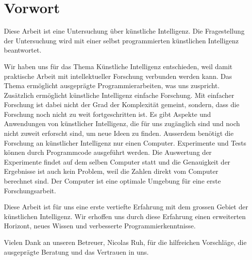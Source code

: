 \section*{Vorwort}
Diese Arbeit ist eine Untersuchung über künstliche Intelligenz. Die
Fragestellung der Untersuchung wird mit einer selbst programmierten künstlichen
Intelligenz beantwortet. 

Wir haben uns für das Thema Künstliche Intelligenz entschieden, weil damit
praktische Arbeit mit intellektueller Forschung verbunden werden kann. Das Thema
ermöglicht ausgeprägte Programmierarbeiten, was uns zuspricht. Zusätzlich
ermöglicht künstliche Intelligenz einfache Forschung. Mit einfacher Forschung
ist dabei nicht der Grad der Komplexität gemeint, sondern, dass die Forschung
noch nicht zu weit fortgeschritten ist. Es gibt Aspekte und Anwendungen von
künstlicher Intelligenz, die für uns zugänglich sind und noch nicht zuweit
erforscht sind, um neue Ideen zu finden. Ausserdem benötigt die Forschung an
künstlicher Intelligenz nur einen Computer. Experimente und Tests können durch
Programmcode ausgeführt werden. Die Auswertung der Experimente findet auf dem
selben Computer statt und die Genauigkeit der Ergebnisse ist auch kein Problem,
weil die Zahlen direkt vom Computer berechnet sind. Der Computer ist eine
optimale Umgebung für eine erste Forschungsarbeit.

Diese Arbeit ist für uns eine erste vertiefte Erfahrung mit dem grossen Gebiet
der künstlichen Intelligenz. Wir erhoffen uns durch diese Erfahrung einen
erweiterten Horizont, neues Wissen und verbesserte Programmierkenntnisse.

Vielen Dank an unseren Betreuer, Nicolas Ruh, für die hilfreichen Vorschläge,
die ausgeprägte Beratung und das Vertrauen in uns.

